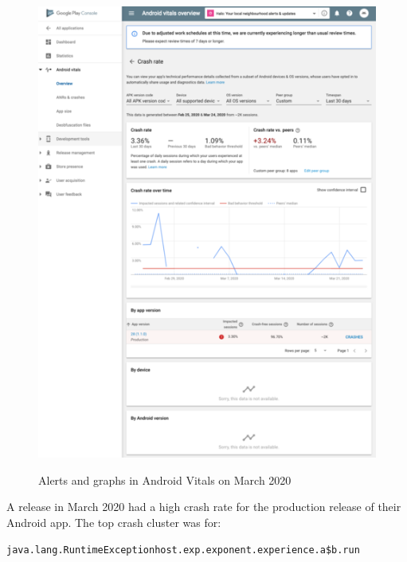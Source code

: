 \begin{figure}[htbp!]
\begin{minipage}{.45\textwidth}
  \label{fig:localhalo-apphealthoverview-high-errors-26-mar-2020}
\end{minipage}\hfill%
\begin{minipage}{.45\textwidth}
  \centering
  \includegraphics[width=\textwidth]{images/localhalo/apphealthdetailsplace_55505963_high_errors.png}
  \label{fig:localhalo-apphealthdetails-high-errors-26-mar-2020}
\end{minipage}
    \caption{Alerts and graphs in Android Vitals on  March 2020}
    \label{fig:localhalo-android-vitals-high-failures-26-march-2020}
\end{figure}
A release in March 2020 had a high crash rate for the production release of their Android app. The top crash cluster was for:

{\small \texttt{java.lang.RuntimeExceptionhost.exp.exponent.experience.a\$b.run}} 

